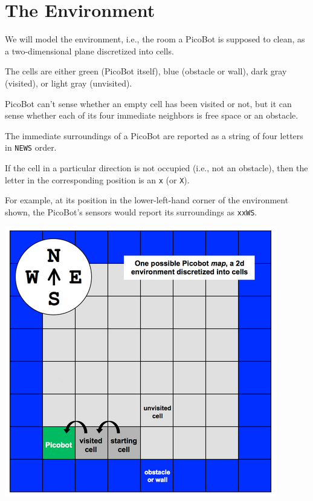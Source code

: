 \documentclass[8pt,a4paper,compress,handout]{beamer}
\begin{document}
\section{The Environment}
\begin{frame}[fragile]
\begin{minipage}{200pt}
We will model the environment, i.e., the room a PicoBot is supposed to clean, as a two-dimensional plane discretized into cells.

\bigskip

The cells are either green (PicoBot itself), blue (obstacle or wall), dark gray (visited), or light gray (unvisited). 

\bigskip

PicoBot can't sense whether an empty cell has been visited or not, but it can sense whether each of its four immediate neighbors is free space or an obstacle.

\bigskip

The immediate surroundings of a PicoBot are reported as a string of four letters in \lstinline{NEWS} order.

\bigskip

If the cell in a particular direction is not occupied (i.e., not an obstacle), then the letter in the corresponding position is an \lstinline{x} (or \lstinline{X}). 

\bigskip

For example, at its position in the lower-left-hand corner of the environment shown, the PicoBot's sensors would report its surroundings as \lstinline{xxWS}.
\end{minipage}\hfill%
\begin{minipage}{100pt}
\begin{center}
\includegraphics[scale=0.25]{figures/picobot_env.png}


\end{center}
\end{minipage}
\end{frame}
\end{document}
